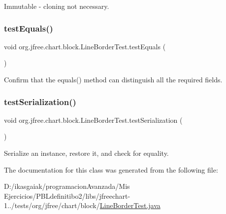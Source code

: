 Immutable -\/ cloning not necessary. \mbox{\label{classorg_1_1jfree_1_1chart_1_1block_1_1_line_border_test_a03be718d18d07851d1aea20ecbe63ede}} 
\subsubsection{\texorpdfstring{test\+Equals()}{testEquals()}}
{\footnotesize\ttfamily void org.\+jfree.\+chart.\+block.\+Line\+Border\+Test.\+test\+Equals (\begin{DoxyParamCaption}{ }\end{DoxyParamCaption})}

Confirm that the equals() method can distinguish all the required fields. \mbox{\label{classorg_1_1jfree_1_1chart_1_1block_1_1_line_border_test_af384c49509551b1488567159d5caf7fe}} 
\subsubsection{\texorpdfstring{test\+Serialization()}{testSerialization()}}
{\footnotesize\ttfamily void org.\+jfree.\+chart.\+block.\+Line\+Border\+Test.\+test\+Serialization (\begin{DoxyParamCaption}{ }\end{DoxyParamCaption})}

Serialize an instance, restore it, and check for equality. 

The documentation for this class was generated from the following file\+:\begin{DoxyCompactItemize}
\item 
D\+:/ikasgaiak/programacion\+Avanzada/\+Mis Ejercicios/\+P\+B\+Ldefinitibo2/libs/jfreechart-\/1../tests/org/jfree/chart/block/\mbox{\hyperlink{_line_border_test_8java}{Line\+Border\+Test.\+java}}\end{DoxyCompactItemize}
